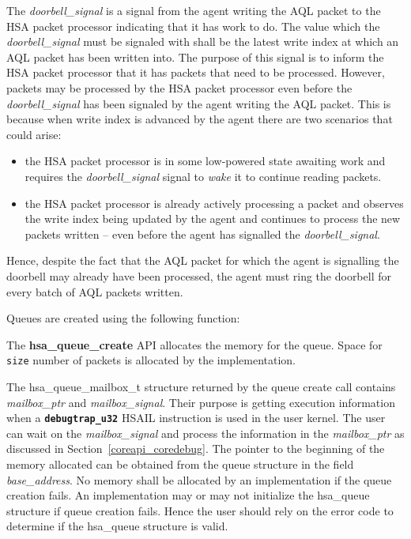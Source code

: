 \documentclass{book}
\newcommand{\diffblock}[1]{#1}
\newcommand{\ttbf}[1]{\diffblock{\texttt{\textbf{#1}}}}
\newcommand{\reffun}[1]{\textbf{#1}}
\newcommand{\reffld}[1]{\textit{#1}}
\newcommand{\reftyp}[1]{#1}
\begin{document}
The \reffld{doorbell\_signal} is a signal from the agent writing the
AQL packet to the HSA packet processor indicating that it has work
to do. The value which the \reffld{doorbell\_signal} must be
signaled with shall be the latest write index at
which an AQL packet has been written into.  The purpose of this
signal is to inform the HSA packet processor that it has
packets that need to be processed. However, packets may be processed
by the HSA packet processor even before the
\reffld{doorbell\_signal} has been signaled by the agent writing the
AQL packet.  This is because when write index is advanced by the
agent there are two scenarios that could arise:
\vspace{-2mm}\begin{itemize}
\item the HSA packet processor is in some low-powered state
  awaiting work and requires the
  \reffld{doorbell\_signal} signal to \emph{wake} it
  to continue reading packets.
\item the HSA
  packet processor is already actively processing a
  packet and observes the write index being
  updated by the agent and continues to process the
  new packets written -- even before the agent has
  signalled the \reffld{doorbell\_signal}.
\end{itemize}
Hence, despite the fact that the AQL packet for which the agent is
signalling the doorbell may already have been processed, the agent
must ring the doorbell for every batch of AQL packets written.

Queues are created using the following function:



The \reffun{hsa\_queue\_create} API allocates the memory for the
queue. Space for \texttt{size} number of packets is allocated by the
implementation.

The \reftyp{hsa\_queue\_mailbox\_t} structure returned by the queue
create call contains \reffld{mailbox\_ptr} and
\reffld{mailbox\_signal}. Their purpose is getting execution
information when a \ttbf{debugtrap\_u32} HSAIL instruction is used in
the user kernel. The user can wait on the \reffld{mailbox\_signal}
and process the information in the \reffld{mailbox\_ptr} as
discussed in Section~\ref{coreapi_coredebug}.  The pointer to the
beginning of the memory allocated can be obtained from the queue
structure in the field \reffld{base\_address}.  No memory shall be
allocated by an implementation if the queue creation fails. An
implementation may or may not initialize the \reftyp{hsa\_queue}
structure if queue creation fails. Hence the user should rely on the
error code to determine if the \reftyp{hsa\_queue} structure is valid.
\end{document}

